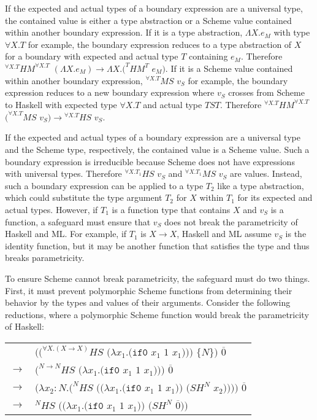 If the expected and actual types of a boundary expression are a universal type, the contained value is either a type abstraction or a Scheme value contained within another boundary expression.  If it is a type abstraction, $\Lambda X.e_{M}$ with type $\forall X.T$ for example, the boundary expression reduces to a type abstraction of $X$ for a boundary with expected and actual type $T$ containing $e_{M}$.  Therefore $^{\forall X.T}HM^{\forall X.T}$ $(\Lambda X.e_{M})\rightarrow\Lambda X.(^{T}HM^{T}$ $e_{M})$.  If it is a Scheme value contained within another boundary expression, $^{\forall X.T}MS$ $v_{S}$ for example, the boundary expression reduces to a new boundary expression where $v_{S}$ crosses from Scheme to Haskell with expected type $\forall X.T$ and actual type $TST$.  Therefore $^{\forall X.T}HM^{\forall X.T}$ $(^{\forall X.T}MS$ $v_{S})\rightarrow{^{\forall X.T}H}S$ $v_{S}$.

If the expected and actual types of a boundary expression are a universal type and the Scheme type, respectively, the contained value is a Scheme value.  Such a boundary expression is irreducible because Scheme does not have expressions with universal types.  Therefore $^{\forall X.T_{1}}HS$ $v_{S}$ and $^{\forall X.T_{1}}MS$ $v_{S}$ are values.  Instead, such a boundary expression can be applied to a type $T_{2}$ like a type abstraction, which could substitute the type argument $T_{2}$ for $X$ within $T_{1}$ for its expected and actual types.  However, if $T_{1}$ is a function type that contains $X$ and $v_{S}$ is a function, a safeguard must ensure that $v_{S}$ does not break the parametricity of Haskell and ML.  For example, if $T_{1}$ is $X\rightarrow X$, Haskell and ML assume $v_{S}$ is the identity function, but it may be another function that satisfies the type and thus breaks parametricity.

To ensure Scheme cannot break parametricity, the safeguard must do two things.  First, it must prevent polymorphic Scheme functions from determining their behavior by the types and values of their arguments.  Consider the following reductions, where a polymorphic Scheme function would break the parametricity of Haskell:

\begin{tabular}{ll}
& $((^{\forall X.(X\rightarrow X)}HS$ $(\lambda x_{1}.(\mathtt{if0}$ $x_{1}$ $1$ $x_{1})))$ $\lbrace N\rbrace)$ $\overline{0}$ \\
$\rightarrow$ & $(^{N\rightarrow N}HS$ $(\lambda x_{1}.(\mathtt{if0}$ $x_{1}$ $1$ $x_{1})))$ $\overline{0}$ \\
$\rightarrow$ & $(\lambda x_{2}:N.(^{N}HS$ $((\lambda x_{1}.(\mathtt{if0}$ $x_{1}$ $1$ $x_{1}))$ $(SH^{N}$ $x_{2}))))$ $\overline{0}$ \\
$\rightarrow$ & $^{N}HS$ $((\lambda x_{1}.(\mathtt{if0}$ $x_{1}$ $1$ $x_{1}))$ $(SH^{N}$ $\overline{0}))$
\end{tabular}

